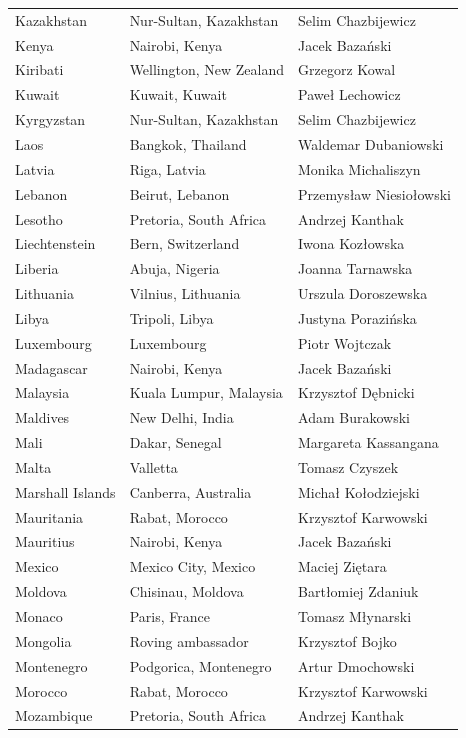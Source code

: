 \documentclass{article}
\begin{document}
\begin{tabular}{lll}
Kazakhstan & Nur-Sultan, Kazakhstan & Selim Chazbijewicz \\
Kenya & Nairobi, Kenya & Jacek Bazański \\
Kiribati & Wellington, New Zealand & Grzegorz Kowal \\
Kuwait & Kuwait, Kuwait & Paweł Lechowicz \\
Kyrgyzstan & Nur-Sultan, Kazakhstan & Selim Chazbijewicz \\
Laos & Bangkok, Thailand & Waldemar Dubaniowski \\
Latvia & Riga, Latvia & Monika Michaliszyn \\
Lebanon & Beirut, Lebanon & Przemysław Niesiołowski \\
Lesotho & Pretoria, South Africa & Andrzej Kanthak \\
Liechtenstein & Bern, Switzerland & Iwona Kozłowska \\
Liberia & Abuja, Nigeria & Joanna Tarnawska \\
Lithuania & Vilnius, Lithuania & Urszula Doroszewska \\
Libya & Tripoli, Libya & Justyna Porazińska \\
Luxembourg & Luxembourg & Piotr Wojtczak \\
Madagascar & Nairobi, Kenya & Jacek Bazański \\
Malaysia & Kuala Lumpur, Malaysia & Krzysztof Dębnicki \\
Maldives & New Delhi, India & Adam Burakowski \\
Mali & Dakar, Senegal & Margareta Kassangana \\
Malta & Valletta & Tomasz Czyszek \\
Marshall Islands & Canberra, Australia & Michał Kołodziejski \\
Mauritania & Rabat, Morocco & Krzysztof Karwowski \\
Mauritius & Nairobi, Kenya & Jacek Bazański \\
Mexico & Mexico City, Mexico & Maciej Ziętara \\
Moldova & Chisinau, Moldova & Bartłomiej Zdaniuk \\
Monaco & Paris, France & Tomasz Młynarski \\
Mongolia & Roving ambassador & Krzysztof Bojko \\
Montenegro & Podgorica, Montenegro & Artur Dmochowski \\
Morocco & Rabat, Morocco & Krzysztof Karwowski \\
Mozambique & Pretoria, South Africa & Andrzej Kanthak \\

\end{tabular}
\end{document}
